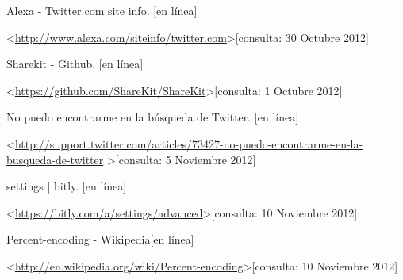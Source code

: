 
\begin{thebibliography}{99}
\begin{sloppypar}


Alexa - Twitter.com site info. [en línea]\

\textless \url{http://www.alexa.com/siteinfo/twitter.com}\textgreater [consulta: 30 Octubre 2012] 

Sharekit - Github. [en línea]\

\textless \url{https://github.com/ShareKit/ShareKit}\textgreater [consulta: 1 Octubre 2012] 


No puedo encontrarme en la búsqueda de Twitter. [en línea]

\textless \url{http://support.twitter.com/articles/73427-no-puedo-encontrarme-en-la-busqueda-de-twitter}
\textgreater [consulta: 5 Noviembre 2012] 

settings | bitly. [en línea]\

\textless \url{https://bitly.com/a/settings/advanced}\textgreater [consulta: 10 Noviembre 2012] 

Percent-encoding - Wikipedia[en línea]\

\textless \url{http://en.wikipedia.org/wiki/Percent-encoding}\textgreater [consulta: 10 Noviembre 2012] 









\end{sloppypar}
\end{thebibliography}
